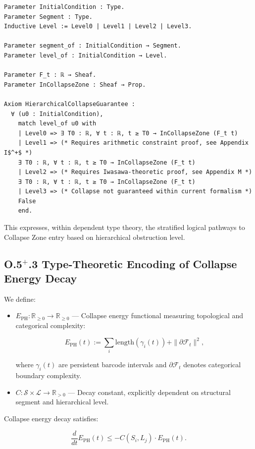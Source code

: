 \documentclass[11pt]{article}
\begin{document}
\begin{lstlisting}[language=Coq]
Parameter InitialCondition : Type.
Parameter Segment : Type.
Inductive Level := Level0 | Level1 | Level2 | Level3.

Parameter segment_of : InitialCondition → Segment.
Parameter level_of : InitialCondition → Level.

Parameter F_t : ℝ → Sheaf.
Parameter InCollapseZone : Sheaf → Prop.

Axiom HierarchicalCollapseGuarantee :
  ∀ (u0 : InitialCondition),
    match level_of u0 with
    | Level0 => ∃ T0 : ℝ, ∀ t : ℝ, t ≥ T0 → InCollapseZone (F_t t)
    | Level1 => (* Requires arithmetic constraint proof, see Appendix I$^+$ *)
    ∃ T0 : ℝ, ∀ t : ℝ, t ≥ T0 → InCollapseZone (F_t t)
    | Level2 => (* Requires Iwasawa-theoretic proof, see Appendix M *)
    ∃ T0 : ℝ, ∀ t : ℝ, t ≥ T0 → InCollapseZone (F_t t)
    | Level3 => (* Collapse not guaranteed within current formalism *)
    False
    end.
\end{lstlisting}

This expresses, within dependent type theory, the stratified logical pathways to Collapse Zone entry based on hierarchical obstruction level.

\subsection*{O.5$^+$.3 Type-Theoretic Encoding of Collapse Energy Decay}

We define:

\begin{itemize}
  \item \( E_{\mathrm{PH}} : \mathbb{R}_{\geq 0} \to \mathbb{R}_{\geq 0} \) — Collapse energy functional measuring topological and categorical complexity:
  
  \[
  E_{\mathrm{PH}}(t) := \sum_i \mathrm{length}(\gamma_i(t)) + \| \partial \mathcal{F}_t \|^2,
  \]
  
  where \( \gamma_i(t) \) are persistent barcode intervals and \( \partial \mathcal{F}_t \) denotes categorical boundary complexity.
  
  \item \( C : \mathcal{S} \times \mathcal{L} \to \mathbb{R}_{> 0} \) — Decay constant, explicitly dependent on structural segment and hierarchical level.
\end{itemize}

Collapse energy decay satisfies:

\[
\frac{d}{dt} E_{\mathrm{PH}}(t) \leq -C(S_i, L_j) \cdot E_{\mathrm{PH}}(t).
\]
\end{document}
